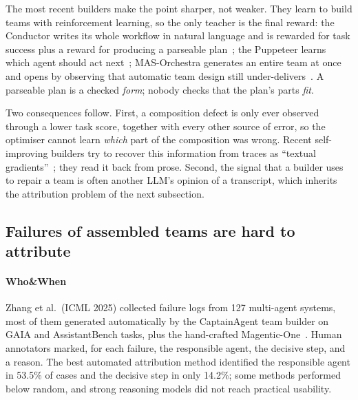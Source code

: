 \documentclass[10pt,a4paper]{article}
\begin{document}
The most recent builders make the point sharper, not weaker. They learn
to build teams with reinforcement learning, so the only teacher is the
final reward: the Conductor writes its whole workflow in natural language
and is rewarded for task success plus a reward for producing a parseable
plan~\cite{nielsen2026conductor}; the Puppeteer learns which agent should
act next~\cite{dang2025puppeteer}; MAS-Orchestra generates an entire team
at once and opens by observing that automatic team design still
under-delivers~\cite{ke2026masorchestra}. A parseable plan is a checked
\emph{form}; nobody checks that the plan's parts \emph{fit}.

Two consequences follow. First, a composition defect is only ever observed
through a lower task score, together with every other source of error, so
the optimiser cannot learn \emph{which} part of the composition was wrong.
Recent self-improving builders try to recover this information from
traces as ``textual gradients''~\cite{he2026tpgo}; they read it back from
prose. Second, the signal that a builder uses to repair a team is often
another LLM's opinion of a transcript, which inherits the attribution
problem of the next subsection.

\subsection{Failures of assembled teams are hard to attribute}\label{sec:ev-attrib}

\paragraph{Who\&When} Zhang et al.\ (ICML 2025) collected failure logs from
127 multi-agent systems, most of them generated automatically by the
CaptainAgent team builder on GAIA and AssistantBench tasks, plus the
hand-crafted Magentic-One~\cite{zhang2025whowhen}. Human annotators marked,
for each failure, the responsible agent, the decisive step, and a reason.
The best automated attribution method identified the responsible agent in
53.5\% of cases and the decisive step in only 14.2\%; some methods
performed below random, and strong reasoning models did not reach
practical usability.
\end{document}
